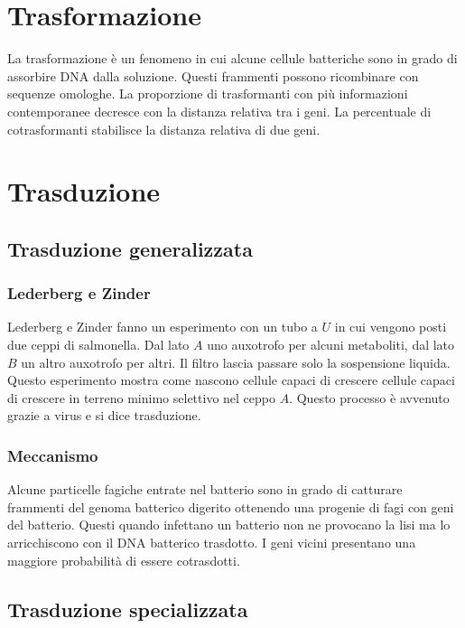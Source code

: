 \section{Trasformazione}
La trasformazione \`e un fenomeno in cui alcune cellule batteriche sono in grado di assorbire DNA dalla soluzione.
Questi frammenti possono ricombinare con sequenze omologhe.
La proporzione di trasformanti con pi\`u informazioni contemporanee decresce con la distanza relativa tra i geni.
La percentuale di cotrasformanti stabilisce la distanza relativa di due geni.

\section{Trasduzione}

	\subsection{Trasduzione generalizzata}

		\subsubsection{Lederberg e Zinder}
		Lederberg e Zinder fanno un esperimento con un tubo a $U$ in cui vengono posti due ceppi di salmonella.
		Dal lato $A$ uno auxotrofo per alcuni metaboliti, dal lato $B$ un altro auxotrofo per altri.
		Il filtro lascia passare solo la sospensione liquida.
		Questo esperimento mostra come nascono cellule capaci di crescere cellule capaci di crescere in terreno minimo selettivo nel ceppo $A$.
		Questo processo \`e avvenuto grazie a virus e si dice trasduzione.

		\subsubsection{Meccanismo}
		Alcune particelle fagiche entrate nel batterio sono in grado di catturare frammenti del genoma batterico digerito ottenendo una progenie di fagi con geni del batterio.
		Questi quando infettano un batterio non ne provocano la lisi ma lo arricchiscono con il DNA batterico trasdotto.
		I geni vicini presentano una maggiore probabilit\`a di essere cotrasdotti.

	\subsection{Trasduzione specializzata}

